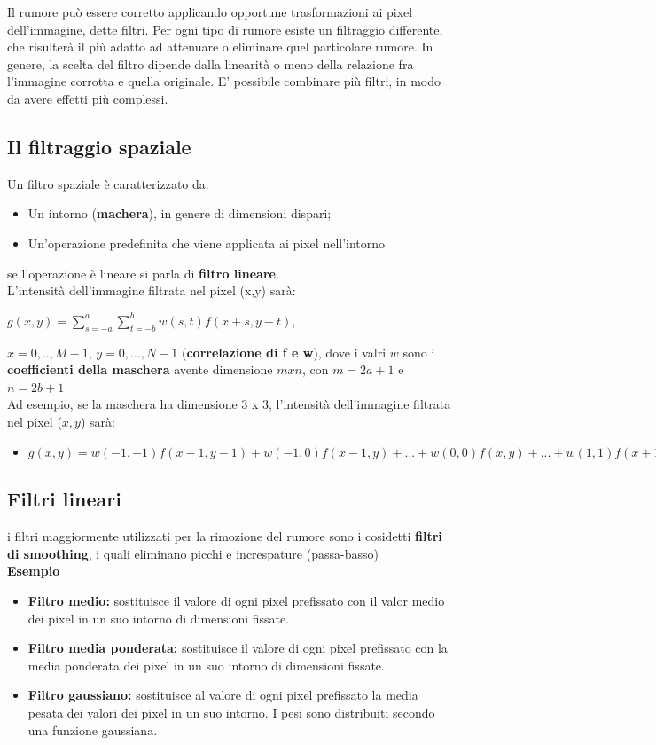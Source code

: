 Il rumore può essere corretto applicando opportune trasformazioni ai pixel dell'immagine, dette filtri.
Per ogni tipo di rumore esiste un filtraggio differente, che risulterà il più adatto ad attenuare o eliminare quel particolare rumore.
In genere, la scelta del filtro dipende dalla linearità o meno della relazione fra l'immagine corrotta e quella originale.
E' possibile combinare più filtri, in modo da avere effetti più complessi.

\subsection{Il filtraggio spaziale}

Un filtro spaziale è caratterizzato da:

\begin{itemize}
    \item Un intorno (\textbf{machera}), in genere di dimensioni dispari;
    \item Un'operazione predefinita che viene applicata ai pixel nell'intorno
\end{itemize}
se l'operazione è lineare si parla di \textbf{filtro lineare}.
\\
L'intensità dell'immagine filtrata nel pixel (x,y) sarà:
\begin{center}
    $g(x,y) = \sum_{s=-a}^{a}\sum_{t=-b}^{b}w(s,t)f(x+s,y+t)$,
\end{center}
$x=0,..,M-1$, $y=0,...,N-1$ (\textbf{correlazione di f e w}), dove i valri $w$ sono i \textbf{coefficienti della maschera}
avente dimensione $m x n$, con $m = 2a+1$ e $n = 2b+1$
\\
Ad esempio, se la maschera ha dimensione 3 x 3, l'intensità dell'immagine filtrata nel pixel ($x,y$) sarà:
\begin{itemize}
    \item $g(x,y)=w(-1,-1)f(x-1,y-1)+w(-1,0)f(x-1,y)+...+w(0,0)f(x,y)+...+w(1,1)f(x+1,y+1)$
\end{itemize}

\subsection{Filtri lineari}

i filtri maggiormente utilizzati per la rimozione del rumore sono i cosidetti \textbf{filtri di smoothing}, i quali eliminano picchi e increspature (passa-basso)
\\
\textbf{Esempio}

\begin{itemize}
    \item \textbf{Filtro medio:} sostituisce il valore di ogni pixel prefissato con il
          valor medio dei pixel in un suo intorno di dimensioni fissate.
    \item \textbf{Filtro media ponderata:} sostituisce il valore di ogni pixel prefissato con la media ponderata dei pixel in un suo
          intorno di dimensioni fissate.
    \item \textbf{Filtro gaussiano:} sostituisce al valore di ogni pixel prefissato la
          media pesata dei valori dei pixel in un suo intorno. I pesi sono distribuiti secondo una funzione gaussiana.
\end{itemize}

